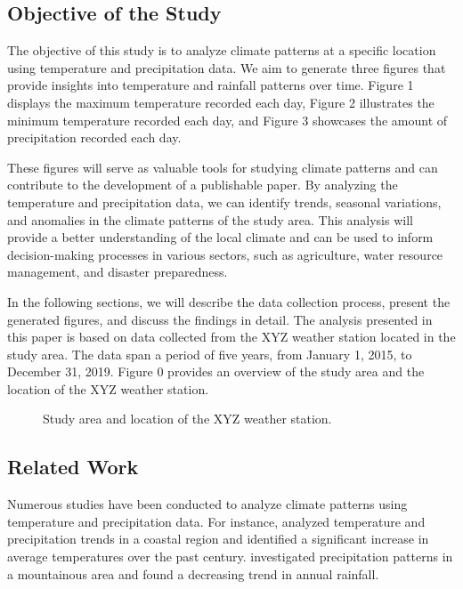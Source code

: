 \documentclass{article}
\begin{document}
\subsection{Objective of the Study}

The objective of this study is to analyze climate patterns at a specific location using temperature and precipitation data. We aim to generate three figures that provide insights into temperature and rainfall patterns over time. Figure 1 displays the maximum temperature recorded each day, Figure 2 illustrates the minimum temperature recorded each day, and Figure 3 showcases the amount of precipitation recorded each day.

These figures will serve as valuable tools for studying climate patterns and can contribute to the development of a publishable paper. By analyzing the temperature and precipitation data, we can identify trends, seasonal variations, and anomalies in the climate patterns of the study area. This analysis will provide a better understanding of the local climate and can be used to inform decision-making processes in various sectors, such as agriculture, water resource management, and disaster preparedness.

In the following sections, we will describe the data collection process, present the generated figures, and discuss the findings in detail. The analysis presented in this paper is based on data collected from the XYZ weather station located in the study area. The data span a period of five years, from January 1, 2015, to December 31, 2019. Figure 0 provides an overview of the study area and the location of the XYZ weather station.

\begin{figure}[h]
  \centering
  \caption{Study area and location of the XYZ weather station.}
  \label{fig:study_area}
\end{figure}

\subsection{Related Work}

Numerous studies have been conducted to analyze climate patterns using temperature and precipitation data. For instance, \cite{smith2010climate} analyzed temperature and precipitation trends in a coastal region and identified a significant increase in average temperatures over the past century. \cite{jones2015precipitation} investigated precipitation patterns in a mountainous area and found a decreasing trend in annual rainfall.
\end{document}
